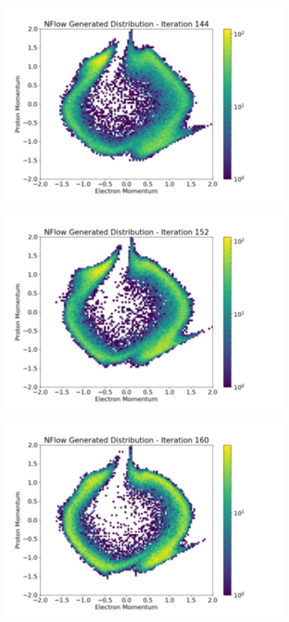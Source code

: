 \documentclass[aspectratio=169]{beamer}
\begin{document}
\begin{frame}[noframenumbering]\centering\includegraphics[width=0.8\textwidth]{images/400training/400training-18.png}\end{frame}
\begin{frame}[noframenumbering]\centering\includegraphics[width=0.8\textwidth]{images/400training/400training-19.png}\end{frame}
\begin{frame}[noframenumbering]\centering\includegraphics[width=0.8\textwidth]{images/400training/400training-20.png}\end{frame}
\end{document}
